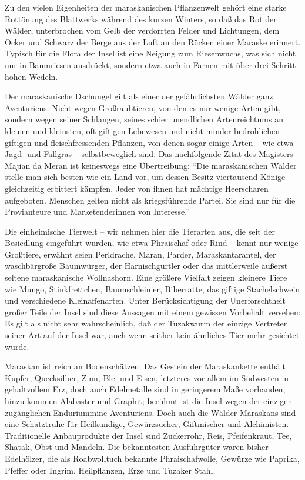 Zu den vielen Eigenheiten der maraskanischen Pflanzenwelt gehört eine starke Rottönung des Blattwerks während des kurzen Winters, so daß das Rot der Wälder, unterbrochen vom Gelb der verdorrten Felder und Lichtungen, dem Ocker und Schwarz der Berge aus der Luft an den Rücken einer Maraske erinnert. Typisch für die Flora der Insel ist eine Neigung zum Riesenwuchs, was sich nicht nur in Baumriesen ausdrückt, sondern etwa auch in Farnen mit über drei Schritt hohen Wedeln.

Der maraskanische Dschungel gilt als einer der gefährlichsten Wälder ganz Aventuriens. Nicht wegen Großraubtieren, von den es nur wenige Arten gibt, sondern wegen seiner Schlangen, seines schier unendlichen Artenreichtums an kleinen und kleinsten, oft giftigen Lebewesen und nicht minder bedrohlichen giftigen und fleischfressenden Pflanzen, von denen sogar einige Arten -- wie etwa Jagd- und Fallgras -- selbstbeweglich sind. Das nachfolgende Zitat des Magisters Majian da Meran ist keineswegs eine Übertreibung: ``Die maraskanischen Wälder stelle man sich besten wie ein Land vor, um dessen Besitz viertausend Könige gleichzeitig erbittert kämpfen. Jeder von ihnen hat mächtige Heerscharen aufgeboten. Menschen gelten nicht als kriegsführende Partei. Sie sind nur für die Provianteure und Marketenderinnen von Interesse.''

Die einheimische Tierwelt -- wir nehmen hier die Tierarten aus, die seit der Besiedlung eingeführt wurden, wie etwa Phraischaf oder Rind -- kennt nur wenige Großtiere, erwähnt seien Perldrache, Maran, Parder, Maraskantarantel, der waschbärgroße Baumwürger, der Harnischgürtler oder das mittlerweile äußerst seltene maraskanische Wollnashorn. Eine größere Vielfalt zeigen kleinere Tiere wie Mungo, Stinkfrettchen, Baumschleimer, Biberratte, das giftige Stachelschwein und verschiedene Kleinaffenarten. Unter Berücksichtigung der Unerforschtheit großer Teile der Insel sind diese Aussagen mit einem gewissen Vorbehalt versehen: Es gilt als nicht sehr wahrscheinlich, daß der Tuzakwurm der einzige Vertreter seiner Art auf der Insel war, auch wenn seither kein ähnliches Tier mehr gesichtet wurde.

Maraskan ist reich an Bodenschätzen: Das Gestein der Maraskankette enthält Kupfer, Quecksilber, Zinn, Blei und Eisen, letzteres vor allem im Südwesten in gehaltvollem Erz, doch auch Edelmetalle sind in geringerem Maße vorhanden, hinzu kommen Alabaster und Graphit; berühmt ist die Insel wegen der einzigen zugänglichen Enduriummine Aventuriens. Doch auch die Wälder Maraskans sind eine Schatztruhe für Heilkundige, Gewürzsucher, Giftmischer und Alchimisten. Traditionelle Anbauprodukte der Insel sind Zuckerrohr, Reis, Pfeifenkraut, Tee, Shatak, Obst und Mandeln. Die bekanntesten Ausführgüter waren bisher Edelhölzer, die als Roabwolltuch bekannte Phraischafwolle, Gewürze wie Paprika, Pfeffer oder Ingrim, Heilpflanzen, Erze und Tuzaker Stahl.

